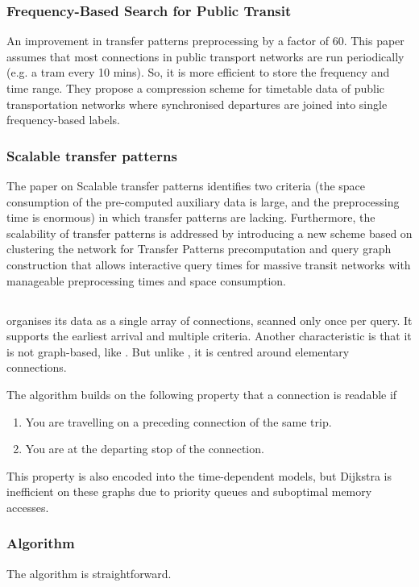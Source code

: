 \subsubsection{Frequency-Based Search for Public Transit}
An improvement in transfer patterns preprocessing by a factor of 60. This paper\cite{bast_frequency-based_2014} assumes that most connections in public transport networks are run periodically (e.g. a tram every 10 mins). So, it is more efficient to store the frequency and time range. They propose a compression scheme for timetable data of public transportation networks where synchronised departures are joined into single frequency-based labels.
\subsubsection{Scalable transfer patterns}
The paper on Scalable transfer patterns \cite{bast_scalable_2015} identifies two criteria (the space consumption of the pre-computed auxiliary data is large, and the preprocessing time is enormous) in which transfer patterns are lacking. Furthermore, the scalability of transfer patterns is addressed by introducing a new scheme based on clustering the network for Transfer Patterns precomputation and query graph construction that allows interactive query times for massive transit networks with manageable preprocessing times and space consumption. 
\subsection{}
 \cite{dibbelt_intriguingly_2013} organises its data as a single array of connections, scanned only once per query. It supports the earliest arrival and multiple criteria. Another characteristic is that it is not graph-based, like . But unlike , it is centred around elementary connections.

The algorithm builds on the following property that a connection is readable if \begin{enumerate}
    \item You are travelling on a preceding connection of the same trip. 
    \item You are at the departing stop of the connection.
\end{enumerate}
This property is also encoded into the time-dependent models\cite{pyrga_efficient_2008}, but Dijkstra is inefficient on these graphs due to priority queues and suboptimal memory accesses. 
\subsubsection{Algorithm}
The  algorithm is straightforward. 

